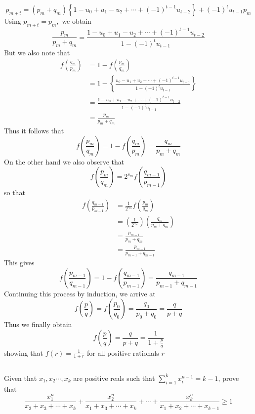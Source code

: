 \documentclass[12pt]{article}
\begin{document}
\[
p_{m+t}=\left(p_{m}+q_{m}\right)\left\{1-u_{0}+u_{1}-u_{2}+\cdots+(-1)^{t-1} u_{t-2}\right\}+(-1)^{t} u_{t-1} p_{m}
\]
Using $p_{m+t}=p_{m},$ we obtain
$$
\frac{p_{m}}{p_{m}+q_{m}}=\frac{1-u_{0}+u_{1}-u_{2}+\cdots+(-1)^{t-1} u_{t-2}}{1-(-1)^{t} u_{t-1}}
$$
But we also note that
\begin{align*}
f\left(\frac{q_{m}}{p_{m}}\right) &=1-f\left(\frac{p_{m}}{q_{m}}\right) \\
&=1-\left\{\frac{u_{0}-u_{1}+u_{2}-\cdots+(-1)^{t-1} u_{t-1}}{1-(-1)^{t} u_{t-1}}\right\} \\
&=\frac{1-u_{0}+u_{1}-u_{2}+\cdots+(-1)^{t-1} u_{t-2}}{1-(-1)^{t} u_{t-1}} \\
&=\frac{p_{m}}{p_{m}+q_{m}}
\end{align*}
Thus it follows that
$$
f\left(\frac{p_{m}}{q_{m}}\right)=1-f\left(\frac{q_{m}}{p_{m}}\right)=\frac{q_{m}}{p_{m}+q_{m}}
$$
On the other hand we also observe that
$$
f\left(\frac{p_{m}}{q_{m}}\right)=2^{s_{m}} f\left(\frac{q_{m-1}}{p_{m-1}}\right)
$$
so that
\begin{align*}
f\left(\frac{q_{m-1}}{p_{m-1}}\right) &=\frac{1}{2^{s_{m}}} f\left(\frac{p_{m}}{q_{m}}\right) \\
&=\left(\frac{1}{2^{s_{m}}}\right)\left(\frac{q_{m}}{p_{m}+q_{m}}\right) \\
&=\frac{p_{m-1}}{p_{m}+q_{m}} \\
&=\frac{p_{m-1}}{p_{m-1}+q_{m-1}}
\end{align*}
This gives
$$
f\left(\frac{p_{m-1}}{q_{m-1}}\right)=1-f\left(\frac{q_{m-1}}{p_{m-1}}\right)=\frac{q_{m-1}}{p_{m-1}+q_{m-1}}
$$Continuing this process by induction, we arrive at
$$
f\left(\frac{p}{q}\right)=f\left(\frac{p_{0}}{q_{0}}\right)=\frac{q_{0}}{p_{0}+q_{0}}=\frac{q}{p+q}
$$
Thus we finally obtain
$$
f\left(\frac{p}{q}\right)=\frac{q}{p+q}=\frac{1}{1+\frac{p}{q}}
$$
showing that $f(r)=\frac{1}{1+r}$ for all positive rationals $r$









\subsection*{}
Given that $x_1,x_2\cdots, x_k$ are positive reals such that $\displaystyle \sum_{i=1}^{k} x_i^{n-1} = k -1$, prove that 
$$ \frac{x_1^n}{x_2+x_3+\cdots + x_k} + \frac{x_2^n}{x_1+x_3+\cdots + x_k} + \cdots + \frac{x_k^n}{x_1+x_2+\cdots + x_{k-1}} \geq 1  $$
\end{document}
